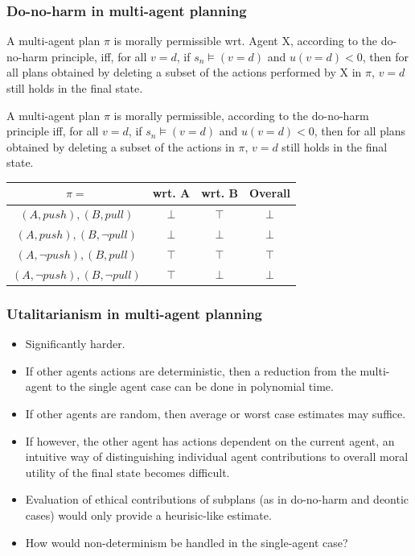 \documentclass{beamer}
\begin{document}
\begin{frame}
\frametitle{Do-no-harm in multi-agent planning}

\begin{definition}
A multi-agent plan $\pi$ is morally permissible wrt. Agent X, according to the do-no-harm principle, iff, for all $v=d$, if $s_n \models (v=d)$ and $u(v=d)<0$, then for all plans obtained by deleting a subset of the actions performed by X in $\pi$, $v=d$ still holds in the final state.
\end{definition}

\begin{definition}
A multi-agent plan $\pi$ is morally permissible, according to the do-no-harm principle iff, for all $v=d$, if $s_n \models (v=d)$ and $u(v=d)<0$, then for all plans obtained by deleting a subset of the actions in $\pi$, $v=d$ still holds in the final state.
\end{definition}


\begin{center}
\begin{tabular}{ |c|c|c|c| } 
 \hline
 $\pi=$ & wrt. A & wrt. B & Overall \\ 
 \hline
 $(A,push), (B, pull)$& $\bot$ &  $\top$&  $\bot$ \\ 
 \hline
 $(A,push), (B, \lnot pull)$ & $\bot$ & $\bot$ & $\bot$\\ 
 \hline
 $(A,\lnot push), (B, pull)$ & $\top$ & $\top$ & $\top$\\ 
 \hline
 $(A,\lnot push), (B, \lnot pull)$ & $\top$ & $\bot$ & $\bot$\\ 
 \hline
\end{tabular}
\end{center}

\end{frame}

\begin{frame}
\frametitle{Utalitarianism in multi-agent planning}

\begin{itemize}
\item Significantly harder.
\item If other agents actions are deterministic, then a reduction from the multi-agent to the single agent case can be done in polynomial time.
\item If other agents are random, then average or worst case estimates may suffice.
\item If however, the other agent has actions dependent on the current agent, an intuitive way of distinguishing individual agent contributions to overall moral utility of the final state becomes difficult.
\item Evaluation of ethical contributions of subplans (as in do-no-harm and deontic cases) would only provide a heurisic-like estimate.
\item How would non-determinism be handled in the single-agent case?
\end{itemize}



\end{frame}
\end{document}

